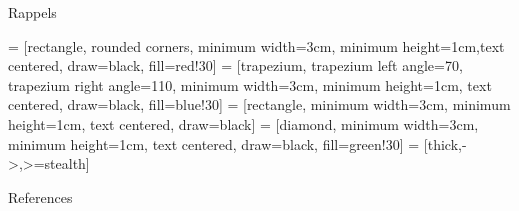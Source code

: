 \begin{frame}[allowframebreaks]{Rappels}
\begin{itemize}
 = [rectangle, rounded corners, minimum width=3cm, minimum height=1cm,text centered, draw=black,
 fill=red!30]
 = [trapezium, trapezium left angle=70, trapezium right angle=110, minimum width=3cm, minimum height=1cm, 
text centered, 
draw=black, fill=blue!30]
 = [rectangle, minimum width=3cm, minimum height=1cm, text centered, draw=black]
 = [diamond, minimum width=3cm, minimum height=1cm, text centered, draw=black, fill=green!30]
 = [thick,->,>=stealth]
\begin{figure}
\end{figure}

\end{itemize}
\end{frame}
   
\begin{frame}[allowframebreaks]{References}


\end{frame}


